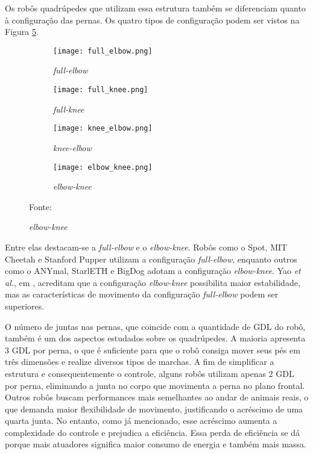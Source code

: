 \documentclass[../main.tex]{subfiles}
\begin{document}
Os robôs quadrúpedes que utilizam essa estrutura também se diferenciam quanto à configuração das pernas. Os quatro tipos de configuração podem ser vistos na Figura \ref{fig:joint_configurations}.

\begin{figure}[h]
  \centering
  \caption{Tipos de configuração de pernas para robôs com estrutura tipo mamífero.}
  \begin{subfigure}[t]{0.24\textwidth}
    \centering
    \texttt{[image: full\_elbow.png]}
    \caption{\textit{full-elbow}}
    \label{fig:joint_configurations_a}
  \end{subfigure}
  \begin{subfigure}[t]{0.24\textwidth}
    \centering
    \texttt{[image: full\_knee.png]}
    \caption{\textit{full-knee}}
    \label{fig:joint_configurations_b}
  \end{subfigure}
  \begin{subfigure}[t]{0.24\textwidth}
    \centering
    \texttt{[image: knee\_elbow.png]}
    \caption{\textit{knee-elbow}}
    \label{fig:joint_configurations_c}
  \end{subfigure}
  \begin{subfigure}[t]{0.24\textwidth}
    \centering
    \texttt{[image: elbow\_knee.png]}
    \caption{\textit{elbow-knee}}
    \label{fig:joint_configurations_d}
  \end{subfigure}

  Fonte: \cite{Yao2021}
  \label{fig:joint_configurations}
\end{figure}

Entre elas destacam-se a \textit{full-elbow} e o \textit{elbow-knee}. Robôs como o Spot, MIT Cheetah e Stanford Pupper utilizam a configuração \textit{full-elbow}, enquanto outros como o ANYmal, StarlETH e BigDog adotam a configuração  \textit{elbow-knee}. Yao \textit{et al.}, em \cite{Yao2021}, acreditam que a configuração \textit{elbow-knee} possibilita maior estabilidade, mas as características de movimento da configuração \textit{full-elbow} podem ser superiores.

O número de juntas nas pernas, que coincide com a quantidade de GDL do robô, também é um dos aspectos estudados sobre os quadrúpedes. A maioria apresenta 3 GDL por perna, o que é suficiente para que o robô consiga mover seus pés em três dimensões e realize diversos tipos de marchas. A fim de simplificar a estrutura e consequentemente o controle, alguns robôs utilizam apenas 2 GDL por perna, eliminando a junta no corpo que movimenta a perna no plano frontal. Outros robôs buscam performances mais semelhantes ao andar de animais reais, o que demanda maior flexibilidade de movimento, justificando o acréscimo de uma quarta junta. No entanto, como já mencionado, esse acréscimo aumenta a complexidade do controle e prejudica a eficiência. Essa perda de eficiência se dá porque mais atuadores significa maior consumo de energia e também mais massa.
\end{document}
